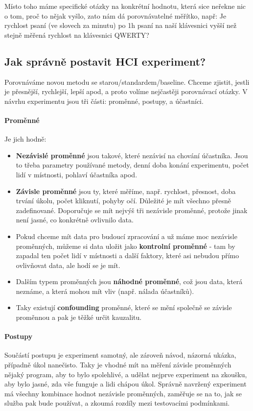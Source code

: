 \documentclass[10pt,a4paper]{article}
\begin{document}
Místo toho máme specifické otázky na konkrétní hodnotu, která sice neřekne nic o tom, proč to nějak vyšlo, zato nám dá porovnávatelné měřítko, např: Je rychlost psaní (ve slovech za minutu) po 1h psaní na naší klávesnici vyšší než stejně měřená rychlost na klávesnici QWERTY?

\subsection{Jak správně postavit HCI experiment?}

Porovnáváme novou metodu se starou/standardem/baseline. Chceme zjistit, jestli je přesnější, rychlejší, lepší apod, a proto volíme nejčastěji porovnávací otázky. V návrhu experimentu jsou tři části: proměnné, postupy, a účastníci.

\paragraph{Proměnné} Je jich hodně:
\begin{itemize}
\item \textbf{Nezávislé proměnné} jsou takové, které nezávisí na chování účastníka. Jsou to třeba parametry používané metody, denní doba konání experimentu, počet lidí v místnosti, pohlaví účastníka apod.
\item \textbf{Závisle proměnné} jsou ty, které měříme, např. rychlost, přesnost, doba trvání úkolu, počet kliknutí, pohyby očí. Důležité je mít všechno přesně zadefinované. Doporučuje se mít nejvýš tři nezávisle proměnné, protože jinak není jasné, co konkrétně ovlivnilo data.
\item Pokud chceme mít data pro budoucí zpracování a už máme moc nezávisle proměnných, můžeme si data uložit jako \textbf{kontrolní proměnné} - tam by zapadal ten počet lidí v místnosti a další faktory, které asi nebudou přímo ovlivňovat data, ale hodí se je mít.
\item Dalším typem proměnných jsou \textbf{náhodné proměnné}, což jsou data, která neznáme, a která mohou mít vliv (např. nálada účastníků).
\item Taky existují \textbf{confounding} proměnné, které se mění společně se závisle proměnnou a pak je těžké určit kauzalitu.

\end{itemize}

\paragraph{Postupy} Součástí postupu je experiment samotný, ale zároveň návod, názorná ukázka, případně úkol nanečisto. Taky je vhodné mít na měření závisle proměnných nějaký program, aby to bylo spolehlivé, a udělat nejprve experiment na zkoušku, aby bylo jasné, zda vše funguje a lidi chápou úkol. Správně navržený experiment má všechny kombinace hodnot nezávisle proměnných, zaměřuje se na to, jak se služba pak bude používat, a zkoumá rozdíly mezi testovacími podmínkami.
\end{document}
